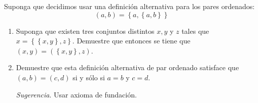 \documentclass[12pt]{report}
\newcounter{it}
\theoremstyle{largebreak}
\begin{document}
    \begin{excer}
        Suponga que decidimos usar una definición alternativa para los pares ordenados:
        \begin{equation*}
            (a,b)=\left\{a,\left\{a,b\right\} \right\}
        \end{equation*}
        \begin{enumerate}[label = \textit{(\alph*)}]
            \item Suponga que existen tres conjuntos distintos $x,y$ y $z$ tales que $x=\left\{\left\{x,y\right\},z \right\}$. Demuestre que entonces se tiene que $(x,y)=(\left\{x,y\right\},z)$.
            \item Demuestre que esta definición alternativa de par ordenado satisface que $(a,b)=(c,d)$ si y sólo si $a=b$ y $c=d$.
            
            \textit{Sugerencia}. Usar axioma de fundación.
        \end{enumerate}
    \end{excer}
\end{document}
